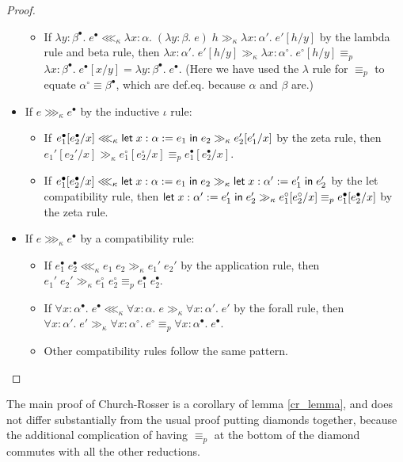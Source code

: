 \begin{proof}
\begin{itemize}
\begin{itemize}
\item If $\lambda y:\beta^\bullet.\;e^\bullet\lll_\kappa\lambda x:\alpha.\;(\lambda y:\beta.\;e)\;h\gg_\kappa \lambda x:\alpha'.\;e'[h/y]$ by the lambda rule and beta rule, then $\lambda x:\alpha'.\;e'[h/y]\gg_\kappa \lambda x:\alpha^\circ.\;e^\circ[h/y]\equiv_p$\\$\lambda x:\beta^\bullet.\;e^\bullet[x/y]=\lambda y:\beta^\bullet.\;e^\bullet$. (Here we have used the $\lambda$ rule for $\equiv_p$ to equate $\alpha^\circ\equiv\beta^\bullet$, which are def.eq. because $\alpha$ and $\beta$ are.)
\end{itemize}
\item If $e\ggg_\kappa e^\bullet$ by the inductive $\iota$ rule:
\begin{itemize}
\item If $e_1^\bullet[e_2^\bullet/x]\lll_\kappa\mathsf{let}\;x:\alpha:=e_1\mathrel{\mathsf{in}}e_2\gg_\kappa e_2'[e_1'/x]$ by the zeta rule, then $e_1'[e_2'/x]\gg_\kappa e_1^\circ[e_2^\circ/x]\equiv_p e_1^\bullet[e_2^\bullet/x]$.
\item If $e_1^\bullet[e_2^\bullet/x]\lll_\kappa\mathsf{let}\;x:\alpha:=e_1\mathrel{\mathsf{in}}e_2\gg_\kappa \mathsf{let}\;x:\alpha':=e_1'\mathrel{\mathsf{in}}e_2'$ by the let compatibility rule, then $\mathsf{let}\;x:\alpha':=e_1'\mathrel{\mathsf{in}}e_2'\gg_\kappa e_1^\circ[e_2^\circ/x]\equiv_p e_1^\bullet[e_2^\bullet/x]$ by the zeta rule.
\end{itemize}
\item If $e\ggg_\kappa e^\bullet$ by a compatibility rule:
\begin{itemize}
\item If $e_1^\bullet\;e_2^\bullet\lll_\kappa e_1\;e_2\gg_\kappa e_1'\;e_2'$ by the application rule, then $e_1'\;e_2'\gg_\kappa e_1^\circ\;e_2^\circ\equiv_p e_1^\bullet\;e_2^\bullet$.
\item If $\forall x:\alpha^\bullet.\;e^\bullet\lll_\kappa \forall x:\alpha.\;e\gg_\kappa \forall x:\alpha'.\;e'$ by the forall rule, then $\forall x:\alpha'.\;e'\gg_\kappa \forall x:\alpha^\circ.\;e^\circ\equiv_p \forall x:\alpha^\bullet.\;e^\bullet$.
\item Other compatibility rules follow the same pattern.
\end{itemize}
\end{itemize}
\end{proof}
The main proof of Church-Rosser is a corollary of lemma \ref{cr_lemma}, and does not differ substantially from the usual proof putting diamonds together, because the additional complication of having $\equiv_p$ at the bottom of the diamond commutes with all the other reductions.
